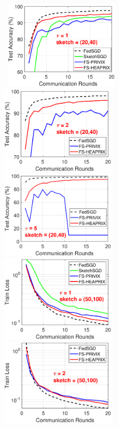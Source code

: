 \documentclass[twoside]{article}
\begin{document}
\begin{figure}[H]
\begin{center}
		\mbox{\hspace{-0.15in}
		\includegraphics[width=2.2in]{MNIST_figures/local1_sketch20_iid1_test_acc.eps} \hspace{-0.15in}
		\includegraphics[width=2.2in]{MNIST_figures/local2_sketch20_iid1_test_acc.eps} \hspace{-0.15in}
		\includegraphics[width=2.2in]{MNIST_figures/local5_sketch20_iid1_test_acc.eps}\hspace{-0.15in}
		}
		\mbox{\hspace{-0.15in}	   
		\includegraphics[width=2.2in]{MNIST_figures/local1_sketch50_iid1_train_loss.eps} \hspace{-0.15in}
		\includegraphics[width=2.2in]{MNIST_figures/local2_sketch50_iid1_train_loss.eps} \hspace{-0.15in}
}
\end{center}
\end{figure}
\end{document}
